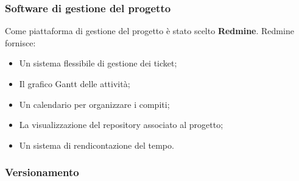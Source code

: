 \subsubsection{Software di gestione del progetto} 
\label{subsec:Software di gestione del prodotto}
Come piattaforma di gestione del progetto è stato scelto \textbf{Redmine}. Redmine fornisce:
\begin{itemize}
\item Un sistema flessibile di gestione dei ticket;
\item Il grafico Gantt delle attività;
\item Un calendario per organizzare i compiti;
\item La visualizzazione del repository associato al progetto;
\item Un sistema di rendicontazione del tempo.
\end{itemize}


\subsubsection{Versionamento}


